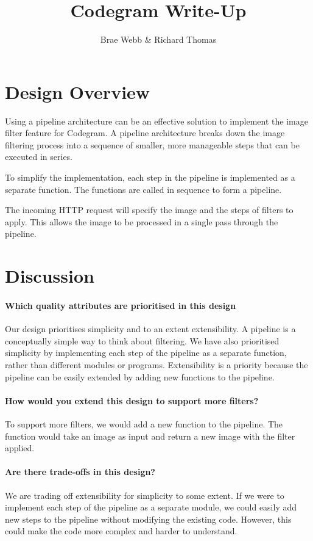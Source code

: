 \documentclass{csse4400}
\title{Codegram Write-Up}
\author{Brae Webb \& Richard Thomas}
\date{\week{2}}
\begin{document}
\maketitle

\section{Design Overview}

Using a pipeline architecture can be an effective solution to implement the image filter feature for Codegram.
A pipeline architecture breaks down the image filtering process into a sequence of smaller,
more manageable steps that can be executed in series.

To simplify the implementation,
each step in the pipeline is implemented as a separate function.
The functions are called in sequence to form a pipeline.

The incoming HTTP request will specify the image and the steps of filters to apply.
This allows the image to be processed in a single pass through the pipeline.


\section{Discussion}

\paragraph{Which quality attributes are prioritised in this design}
Our design prioritises simplicity and to an extent extensibility.
A pipeline is a conceptually simple way to think about filtering.
We have also prioritised simplicity by implementing each step of the pipeline as a separate function,
rather than different modules or programs.
Extensibility is a priority because the pipeline can be easily extended by adding new functions to the pipeline.

\paragraph{How would you extend this design to support more filters?}
To support more filters, we would add a new function to the pipeline.
The function would take an image as input and return a new image with the filter applied.

\paragraph{Are there trade-offs in this design?}
We are trading off extensibility for simplicity to some extent.
If we were to implement each step of the pipeline as a separate module, we could easily add new steps to the pipeline without modifying the existing code.
However, this could make the code more complex and harder to understand.
\end{document}
